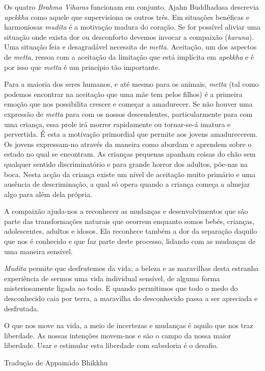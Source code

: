 Os quatro \emph{Brahma Viharas} funcionam em conjunto. Ajahn Buddhadasa
descrevia \emph{upekkha} como aquele que supervisiona os outros três. Em
situações benéficas e harmoniosas \emph{mudita} é a motivação madura do
coração. Se for possível aliviar uma situação onde exista dor ou
desconforto devemos invocar a compaixão (\emph{karuna}). Uma situação
feia e desagradável necessita de \emph{metta}. Aceitação, um dos
aspectos de \emph{metta}, ressoa com a aceitação da limitação que está
implícita em \emph{upekkha} e é por isso que \emph{metta} é um princípio
tão importante.

Para a maioria dos seres humanos, e até mesmo para os animais,
\emph{metta} (tal como podemos encontrar na aceitação que uma mãe tem
pelos filhos) é a primeira emoção que nos possibilita crescer e começar
a amadurecer. Se não houver uma expressão de \emph{metta} para com os
nossos descendentes, particularmente para com uma criança, essa prole
irá morrer rapidamente ou tornar-se-á imatura e pervertida. É esta a
motivação primordial que permite aos jovens amadurecerem. Os jovens
expressam-no através da maneira como abordam e aprendem sobre o estado
no qual se encontram. As crianças pequenas apanham coisas do chão sem
qualquer sentido discriminatório e para grande horror dos adultos,
põe-nas na boca. Nesta acção da criança existe um nível de aceitação
muito primário e uma ausência de descriminação, a qual só opera quando a
criança começa a almejar algo para além dela própria.

A compaixão ajuda-nos a reconhecer as mudanças e desenvolvimentos que
são parte das transformações naturais que ocorrem enquanto somos bebés,
crianças, adolescentes, adultos e idosos. Ela reconhece também a dor da
separação daquilo que nos é conhecido e que faz parte deste processo,
lidando com as mudanças de uma maneira sensível.

\emph{Mudita} permite que desfrutemos da vida; a beleza e as maravilhas
desta estranha experiência de sermos uma vida individual sensível, de
alguma forma misteriosamente ligada ao todo. E quando permitimos que
todo o medo do desconhecido caia por terra, a maravilha do desconhecido
passa a ser apreciada e desfrutada.

O que nos move na vida, a meio de incertezas e mudanças é aquilo que nos
traz liberdade. As nossas intenções movem-nos e são o campo da nossa
maior liberdade. Usar e estimular esta liberdade com sabedoria é o
desafio.

Tradução de Appamādo Bhikkhu
